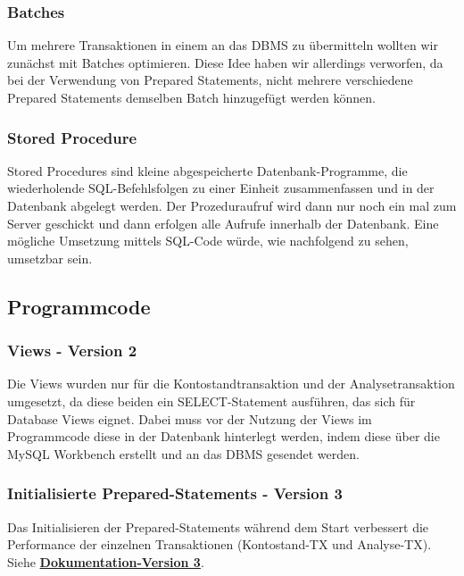 \subsubsection{Batches}
Um mehrere Transaktionen in einem an das DBMS zu übermitteln wollten wir zunächst mit Batches optimieren.
Diese Idee haben wir allerdings verworfen, da bei der Verwendung von Prepared Statements, nicht mehrere verschiedene Prepared Statements demselben Batch hinzugefügt werden können.
\subsubsection{Stored Procedure}
Stored Procedures sind kleine abgespeicherte Datenbank-Programme, die wiederholende SQL-Befehlsfolgen zu einer Einheit zusammenfassen und in der Datenbank abgelegt werden.
Der Prozeduraufruf wird dann nur noch ein mal zum Server geschickt und dann erfolgen alle Aufrufe innerhalb der Datenbank.
Eine mögliche Umsetzung mittels SQL-Code würde, wie nachfolgend zu sehen, umsetzbar sein.

\subsection{Programmcode}\label{subsec:programmcode}
\subsubsection{Views - Version 2}
Die Views wurden nur für die Kontostandtransaktion und der Analysetransaktion umgesetzt, da diese beiden ein SELECT-Statement ausführen, das sich für Database Views eignet.
Dabei muss vor der Nutzung der Views im Programmcode diese in der Datenbank hinterlegt werden, indem diese über die MySQL Workbench erstellt und an das DBMS gesendet werden.



\subsubsection{Initialisierte Prepared-Statements - Version 3}
Das Initialisieren der Prepared-Statements während dem Start verbessert die Performance der einzelnen Transaktionen (Kontostand-TX und Analyse-TX).
Siehe \hyperref[subsec:version3]{\textbf{Dokumentation-Version 3}}.


